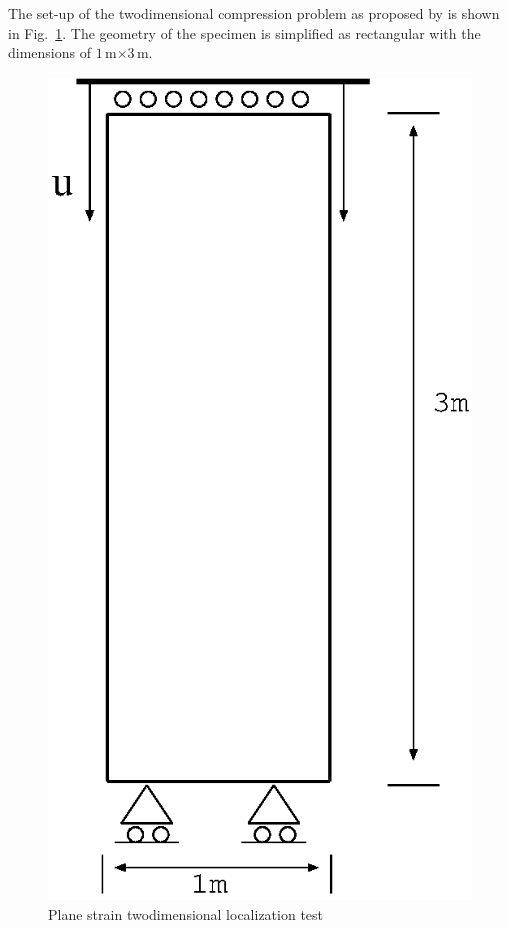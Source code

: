 The set-up of the twodimensional compression problem as proposed by \cite{Bo00} is shown in Fig.~\ref{Mp_fig:biaxial}. The geometry of the specimen is simplified as rectangular with the dimensions of $1\,$m$\times 3\,$m.
\begin{figure}[!htb]
\center
\includegraphics[scale=0.425]{PART_II/M/biaxial.eps}
\caption{Plane strain twodimensional localization test}
 \label{Mp_fig:biaxial}
\end{figure}

